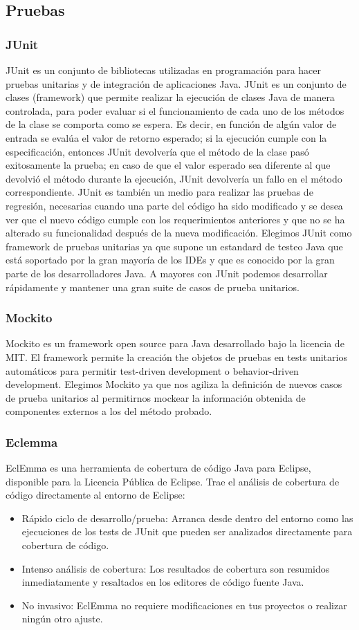 \documentclass[12pt, a4paper, twoside]{book}
\begin{document}
	\subsection{Pruebas}
	\subsubsection{JUnit}
	JUnit es un conjunto de bibliotecas utilizadas en programación para hacer
	pruebas unitarias y de integración de aplicaciones Java.
	JUnit es un conjunto de clases (framework) que permite realizar la ejecución
	de clases Java de manera controlada, para poder evaluar si el funcionamiento de
	cada uno de los métodos de la clase se comporta como se espera. Es decir, en
	función de algún valor de entrada se evalúa el valor de retorno esperado; si la
	ejecución cumple con la especificación, entonces JUnit devolvería que el método
	de la clase pasó exitosamente la prueba; en caso de que el valor esperado sea
	diferente al que devolvió el método durante la ejecución, JUnit devolvería un fallo
	en el método correspondiente.
	JUnit es también un medio para realizar las pruebas de regresión, necesarias
	cuando una parte del código ha sido modificado y se desea ver que el nuevo código
	cumple con los requerimientos anteriores y que no se ha alterado su funcionalidad
	después de la nueva modificación.\cite{JUnit}
	Elegimos JUnit como framework de pruebas unitarias ya que supone un estandard de testeo Java que está soportado por la gran mayoría de los IDEs y que es conocido por la gran parte de los desarrolladores Java. A mayores con JUnit podemos desarrollar rápidamente y mantener una gran suite de casos de prueba unitarios.
	\subsubsection{Mockito}
	Mockito es un framework open source para Java desarrollado bajo la licencia de MIT. El framework permite la creación the objetos de pruebas en tests unitarios automáticos para permitir test-driven development o behavior-driven development. Elegimos Mockito ya que nos agiliza la definición de nuevos casos de prueba unitarios al permitirnos mockear la información obtenida de componentes externos a los del método probado.
	\subsubsection{Eclemma}	
	EclEmma es una herramienta de cobertura de código Java para Eclipse, disponible para la Licencia Pública de Eclipse. Trae el análisis de cobertura de código directamente al entorno de Eclipse:\cite{Eclemma}		
	\begin{itemize}
		\item Rápido ciclo de desarrollo/prueba: Arranca desde dentro del entorno como las ejecuciones de los tests de JUnit que pueden ser analizados directamente para cobertura de código.
		\item Intenso análisis de cobertura: Los resultados de cobertura son resumidos inmediatamente y resaltados en los editores de código fuente Java.
		\item No invasivo: EclEmma no requiere modificaciones en tus proyectos o realizar ningún otro ajuste.
	\end{itemize}	
\end{document}
